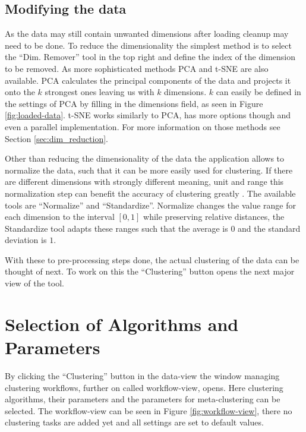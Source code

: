 \documentclass[
	a4paper,
	english,
	twoside,
	openright,               
	11pt                            
	]{report}
\begin{document}
\subsection{Modifying the data}

As the data may still contain unwanted dimensions after loading cleanup may need to be done. To reduce the dimensionality the simplest method is to select the ``Dim. Remover'' tool in the top right and define the index of the dimension to be removed. As more sophisticated methods PCA \cite{pca} and t-SNE \cite{Maaten2008VisualizingDU} are also available. PCA calculates the principal components of the data and projects it onto the $k$ strongest ones leaving us with $k$ dimensions. $k$ can easily be defined in the settings of PCA by filling in the dimensions field, as seen in Figure \ref{fig:loaded-data}. t-SNE works similarly to PCA, has more options though and even a parallel implementation. For more information on those methods see Section \ref{sec:dim_reduction}.

Other than reducing the dimensionality of the data the application allows to normalize the data, such that it can be more easily used for clustering. If there are different dimensions with strongly different meaning, unit and range this normalization step can benefit the accuracy of clustering greatly \cite{normalization}. The available tools are ``Normalize'' and ``Standardize''. Normalize changes the value range for each dimension to the interval $[0,1]$ while preserving relative distances, the Standardize tool adapts these ranges such that the average is $0$ and the standard deviation is $1$.

With these to pre-processing steps done, the actual clustering of the data can be thought of next. To work on this the ``Clustering'' button opens the next major view of the tool.

\section{Selection of Algorithms and Parameters}\label{sec:sel_alg_param}
By clicking the ``Clustering'' button in the data-view the window managing clustering workflows, further on called workflow-view, opens. Here clustering algorithms, their parameters and the parameters for meta-clustering can be selected. The workflow-view can be seen in Figure \ref{fig:workflow-view}, there no clustering tasks are added yet and all settings are set to default values.
\end{document}
